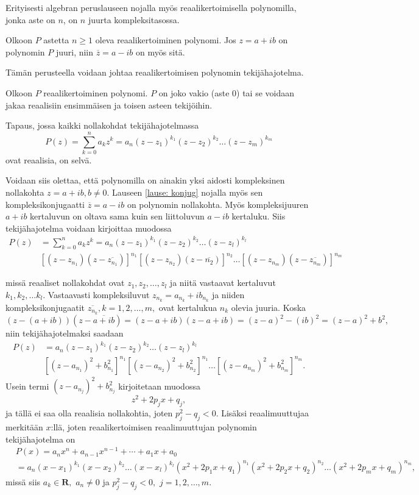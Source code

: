 \documentclass[a4paper, 12pt]{article}
\theoremstyle{remark}
\theoremstyle{definition}
\renewcommand{\bar}[1]{\overline{#1}}
\begin{document}
Erityisesti algebran peruslauseen nojalla myös reaalikertoimisella polynomilla, jonka aste on $n$, on $n$ juurta kompleksitasossa. 

\begin{lause}\label{lause: konjug} Olkoon $P$ astetta $n\geq 1$ oleva reaalikertoiminen polynomi. Jos $z=a+ib$ on polynomin $P$ juuri, niin $\bar{z}=a-ib$ on myös sitä.
\end{lause}

Tämän perusteella voidaan johtaa reaalikertoimisen polynomin tekijähajotelma.

\begin{lause}\label{lause: hajotelma} Olkoon $P$ reaalikertoiminen polynomi. $P$ on joko vakio (aste 0) tai se voidaan jakaa reaalisiin ensimmäisen ja toisen asteen tekijöihin.
\end{lause}
\begin{tod}
Tapaus, jossa kaikki nollakohdat tekijähajotelmassa $$
P(z)=\sum_{k=0}^n a_k z^k=a_n(z-z_1)^{k_1}(z-z_2)^{k_2}\ldots (z-z_m)^{k_m}
$$
ovat reaalisia, on selvä.

Voidaan siis olettaa, että polynomilla on ainakin yksi aidosti kompleksinen nollakohta $z=a+ib, b\neq 0.$ Lauseen \ref{lause: konjug} nojalla myös sen kompleksikonjugaatti $\bar{z}=a-ib$ on polynomin nollakohta. Myös kompleksijuuren $a+ib$ kertaluvun on oltava sama kuin sen liittoluvun $a-ib$ kertaluku. Siis tekijähajotelma voidaan kirjoittaa muodossa
\begin{align*}
P(z)&=\sum_{k=0}^n a_k z^k=a_n(z-z_1)^{k_1}(z-z_2)^{k_2}\ldots (z-z_l)^{k_l}\\
&\left[ (z-z_{n_1})(z-\bar{z_{n_1}})\right]^{n_1}\left[ (z-z_{n_2})(z-\bar{n_2})\right]^{n_2}\ldots \left[ (z-z_{n_m})(z-\bar{z_{n_m}} )\right]^{n_{m}}
\end{align*}
\end{tod}
missä reaaliset nollakohdat ovat $z_1, z_2,\ldots, z_l$ ja niitä vastaavat kertaluvut $k_1, k_2, \ldots k_l.$ Vastaavasti kompleksiluvut $z_{n_k}=a_{n_k}+ib_{n_k}$ ja niiden kompleksikonjugaatit $\bar{z_{n_k}}, k=1,2,\ldots, m,$ ovat kertalukua $n_k$ olevia juuria. Koska
$$
(z-(a+ib))(z-\bar{a+ib})=(z-a+ib)(z-a+ib)=(z-a)^2-(ib)^2=(z-a)^2+b^2,
$$
niin tekijähajotelmaksi saadaan
\begin{align*}
P(z)&=a_n(z-z_1)^{k_1}(z-z_2)^{k_2}\ldots (z-z_l)^{k_l}\\
&\left[ (z-a_{n_1})^2 +b_{n_1}^2\right]^{n_1}\left[ (z-a_{n_2})^2 +b_{n_2}^2\right]^{n_1}\ldots \left[ (z-a_{n_m})^2 +b_{n_m}^2\right]^{n_m}.
\end{align*}
Usein termi
$
(z-a_{n_j})^2+b_{n_j}^2
$
kirjoitetaan muodossa
$$
z^2+2p_{j}x+q_j,
$$
ja tällä ei saa olla reaalisia nollakohtia, joten $p_j^2-q_j<0.$ Lisäksi reaalimuuttujaa merkitään $x$:llä, joten reaalikertoimisen reaalimuuttujan polynomin tekijähajotelma on
\begin{align*}
&P(x)=a_nx^n+a_{n-1}x^{n-1}+\cdots +a_1x+a_0\\&=a_n(x-x_1)^{k_1}(x-x_2)^{k_2}\ldots (x-x_l)^{k_l}(x^2+2p_1x+q_1)^{n_1}(x^2+2p_2x+q_2)^{n_2}\ldots (x^2+2p_mx+q_m)^{n_m},
\end{align*}
missä siis $a_k\in \mathbf{R},$ $a_n\neq 0$ ja $p_j^2-q_j<0,$ $j=1,2,\ldots, m.$
\clearpage
\end{document}
